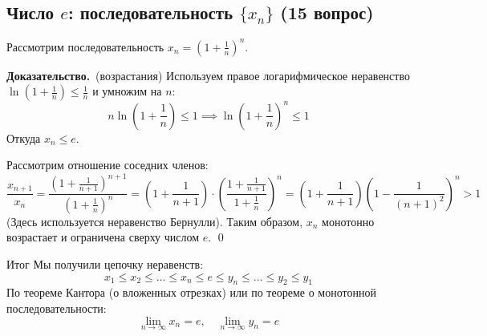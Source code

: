 \documentclass[a4paper,12pt]{article}
\newcommand{\myproof}{\textbf{Доказательство.}\ }
\begin{document}
	
	\vspace{1cm}
	\subsection{Число $e$: последовательность $\{x_n\}$ (15 вопрос)}
	
	Рассмотрим последовательность $x_n = \left(1 + \frac{1}{n}\right)^n$.
	
	\vspace{0.5cm}
	\myproof (возрастания)
	Используем правое логарифмическое неравенство $\ln(1+\frac{1}{n}) \le \frac{1}{n}$ и умножим на $n$:
	\[ n \ln\left(1 + \frac{1}{n}\right) \le 1 \implies \ln\left(1 + \frac{1}{n}\right)^n \le 1 \]
	Откуда $x_n \le e$.
	
	Рассмотрим отношение соседних членов:
	\[ \frac{x_{n+1}}{x_n} = \frac{\left(1 + \frac{1}{n+1}\right)^{n+1}}{\left(1 + \frac{1}{n}\right)^n} = \left(1 + \frac{1}{n+1}\right) \cdot \left( \frac{1 + \frac{1}{n+1}}{1 + \frac{1}{n}} \right)^n = \left(1 + \frac{1}{n+1}\right) \left( 1 - \frac{1}{(n+1)^2} \right)^n > 1 \]
	(Здесь используется неравенство Бернулли). Таким образом, $x_n$ монотонно возрастает и ограничена сверху числом $e$. \qed
	
	\begin{center}
	\end{center}
	
	\begin{importantbox}{Итог}
		Мы получили цепочку неравенств:
		\[ x_1 \le x_2 \le \dots \le x_n \le e \le y_n \le \dots \le y_2 \le y_1 \]
		По теореме Кантора (о вложенных отрезках) или по теореме о монотонной последовательности:
		\[ \lim_{n \to \infty} x_n = e, \quad \lim_{n \to \infty} y_n = e \]
	\end{importantbox}
	
	
	
\end{document}
